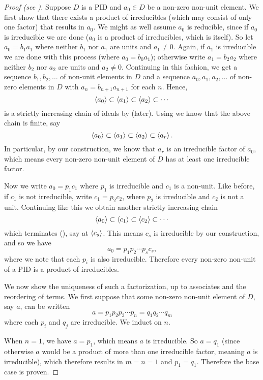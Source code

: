 \begin{proof}[Proof (see {\cite[pp.~313-314]{gallian_2016}})]
    Suppose $D$ is a PID and $a_0 \in D$ be a non-zero non-unit element. We first show that there exists a product of irreducibles (which may consist of only one factor) that results in $a_0$. We might as well assume $a_0$ is reducible, since if $a_0$ is irreducible we are done ($a_0$ is a product of irreducibles, which is itself). So let $a_0 = b_1a_1$ where neither $b_1$ nor $a_1$ are units and $a_1 \neq 0$. Again, if $a_1$ is irreducible we are done with this process (where $a_0 = b_0a_1$); otherwise write $a_1 = b_2a_2$ where neither $b_2$ nor $a_2$ are units and $a_2 \neq 0$. Continuing in this fashion, we get a sequence $b_1,b_2,\dots$ of non-unit elements in $D$ and a sequence $a_0,a_1,a_2,\dots$ of non-zero elements in $D$ with $a_n = b_{n+1}a_{n+1}$ for each $n$. Hence,
    \[
        \left\langle a_0\right\rangle \subset \left\langle a_1\right\rangle \subset \left\langle a_2\right\rangle \subset \cdots
    \]
    is a strictly increasing chain of ideals by  (later). Using  we know that the above chain is finite, say
    \[
        \left\langle a_0\right\rangle \subset \left\langle a_1\right\rangle \subset \left\langle a_2\right\rangle \subset \left\langle a_r\right\rangle.
    \]
    In particular, by our construction, we know that $a_r$ is an irreducible factor of $a_0$, which means every non-zero non-unit element of $D$ has at least one irreducible factor.

    Now we write $a_0 = p_1c_1$ where $p_1$ is irreducible and $c_1$ is a non-unit. Like before, if $c_1$ is not irreducible, write $c_1 = p_2c_2$, where $p_2$ is irreducible and $c_2$ is not a unit. Continuing like this we obtain another strictly increasing chain
    \[
        \left\langle a_0\right\rangle \subset \left\langle c_1\right\rangle \subset \left\langle c_2\right\rangle \subset \cdots
    \]
    which terminates (), say at $\left\langle c_s\right\rangle$. This means $c_s$ is irreducible by our construction, and so we have
    \[
        a_0 = p_1p_2\cdots p_sc_s,
    \]
    where we note that each $p_i$ is also irreducible. Therefore every non-zero non-unit of a PID is a product of irreducibles.

    We now show the uniqueness of such a factorization, up to associates and the reordering of terms. We first suppose that some non-zero non-unit element of $D$, say $a$, can be written
    \[
        a = p_1p_2p_3\cdots p_n = q_1q_2 \cdots q_m
    \]
    where each $p_i$ and $q_j$ are irreducible. We induct on $n$.

    When $n = 1$, we have $a = p_1$, which means $a$ is irreducible. So $a = q_1$ (since otherwise $a$ would be a product of more than one irreducible factor, meaning $a$ is irreducible), which therefore results in $m = n = 1$ and $p_1 = q_1$. Therefore the base case is proven.


\end{proof}
